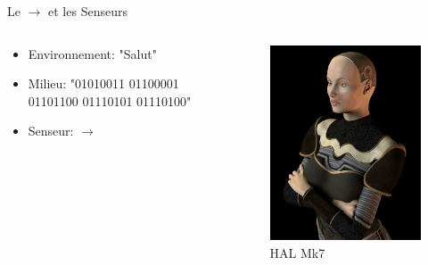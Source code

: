 \documentclass{beamer}
\begin{document}
\begin{frame}{Le $\to$ et les Senseurs}
\begin{columns}
\begin{column}{0.4\textwidth}
\begin{block}{}

\begin{itemize}
    \item Environnement: "Salut"
    \item Milieu: "01010011 01100001 01101100 01110101 01110100"
    \item Senseur: $\to$
\end{itemize}

\end{block}
\end{column}
\begin{column}{0.45\textwidth}
\begin{block}{}
\begin{figure}
    \centering
    \includegraphics[width=\textwidth]{Vis_HAL_Mk7.jpg}
    \caption{HAL Mk7}
    \label{fig:hal}
\end{figure}
\end{block}
\end{column}
\end{columns}
\end{frame}
\end{document}
